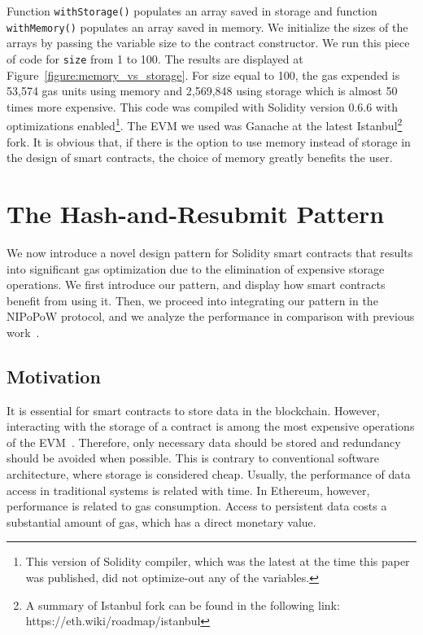 Function \texttt{withStorage()} populates an array saved in storage and
function \texttt{withMemory()} populates an array saved in memory. We
initialize the sizes of the arrays by passing the variable \textsf{size} to the
contract constructor. We run this piece of code for \texttt{size} from 1 to
100. The results are displayed at Figure~\ref{figure:memory_vs_storage}. For
\textsf{size} equal to 100, the gas expended is 53,574 gas units using memory
and 2,569,848 using storage which is almost 50 times more expensive. This code
was compiled with Solidity version 0.6.6 with optimizations
enabled\footnote{This version of Solidity compiler, which was the latest at the
time this paper was published, did not optimize-out any of the variables.}. The
EVM we used  was Ganache at the latest Istanbul\footnote{A summary of Istanbul
fork can be found in the following link: https://eth.wiki/roadmap/istanbul}
fork. It is obvious that, if there is the option to use memory instead of
storage in the design of smart contracts, the choice of memory greatly benefits
the user.



\section{The Hash-and-Resubmit Pattern}

We now introduce a novel design pattern for Solidity smart contracts that
results into significant gas optimization due to the elimination of expensive
storage operations. We first introduce our pattern, and display how smart
contracts benefit from using it. Then, we proceed into integrating our pattern
in the NIPoPoW protocol, and we analyze the performance in comparison with
previous work~\cite{gglou}.

\subsection{Motivation}
It is essential for smart contracts to store data in the blockchain. However,
interacting with the storage of a contract is among the most expensive
operations of the EVM~\cite{wood, buterin}. Therefore, only necessary data
should be stored and redundancy should be avoided when possible. This is
contrary to conventional software architecture, where storage is considered
cheap. Usually, the performance of data access in traditional systems is
related with time. In Ethereum, however, performance is related to gas
consumption. Access to persistent data costs a substantial amount of gas, which
has a direct monetary value.

